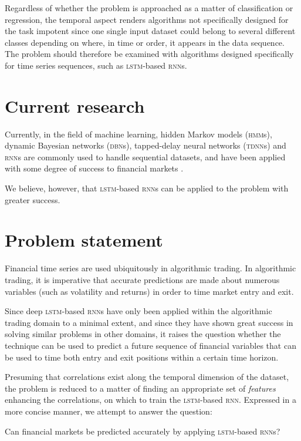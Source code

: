 Regardless of whether the problem is approached as a matter of classification or
regression, the temporal aspect renders algorithms not specifically designed for
the task impotent since one single input dataset could belong to several
different classes depending on where, in time or order, it appears in the data
sequence.  The problem should therefore be examined with algorithms designed
specifically for time series sequences, such as \textsc{lstm}-based
\textsc{rnn}s.

\section{Current research}
Currently, in the field of machine learning, hidden Markov models
(\textsc{hmm}s), dynamic Bayesian networks (\textsc{dbn}s), tapped-delay neural
networks (\textsc{tdnn}s) and \textsc{rnn}s are commonly used to handle
sequential datasets, and have been applied with some degree of success to
financial markets \citep{saad1998,kita2012,zhang2004}.

We believe, however, that \textsc{lstm}-based \textsc{rnn}s can be applied to
the problem with greater success.

\section{Problem statement}
Financial time series are used ubiquitously in algorithmic trading.  In
algorithmic trading, it is imperative that accurate predictions are made about
numerous variables (such as volatility and returns) in order to time market
entry and exit.

Since deep \textsc{lstm}-based \textsc{rnn}s have only been applied within the
algorithmic trading domain to a minimal extent, and since they have shown great
success in solving similar problems in other domains, it raises the question
whether the technique can be used to predict a future sequence of financial
variables that can be used to time both entry and exit positions within a
certain time horizon.

Presuming that correlations exist along the temporal dimension of the dataset,
the problem is reduced to a matter of finding an appropriate set of
\textit{features} enhancing the correlations, on which to train the
\textsc{lstm}-based \textsc{rnn}.  Expressed in a more concise manner, we
attempt to answer the question:

Can financial markets be predicted accurately by applying \textsc{lstm}-based
\textsc{rnn}s?
